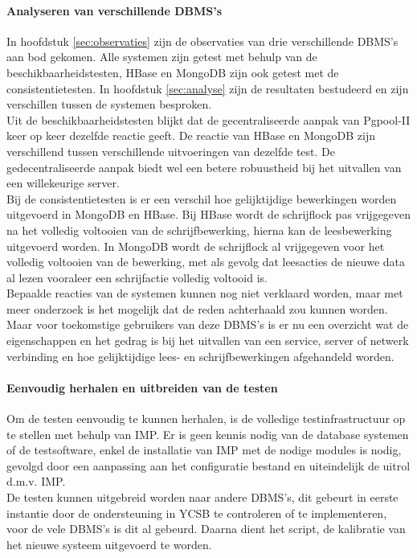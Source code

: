 \paragraph{Analyseren van verschillende DBMS's} In hoofdstuk \ref{sec:observaties} zijn de observaties van drie verschillende DBMS's aan bod gekomen. Alle systemen zijn getest met behulp van de beschikbaarheidstesten, HBase en MongoDB zijn ook getest met de consistentietesten. In hoofdstuk \ref{sec:analyse} zijn de resultaten bestudeerd en zijn verschillen tussen de systemen besproken. \\
Uit de beschikbaarheidstesten blijkt dat de gecentraliseerde aanpak van Pgpool-II keer op keer dezelfde reactie geeft. De reactie van HBase en MongoDB zijn verschillend tussen verschillende uitvoeringen van dezelfde test. De gedecentraliseerde aanpak biedt wel een betere robuustheid bij het uitvallen van een willekeurige server. \\
Bij de consistentietesten is er een verschil hoe gelijktijdige bewerkingen worden uitgevoerd in MongoDB en HBase. Bij HBase wordt de schrijflock pas vrijgegeven na het volledig voltooien van de schrijfbewerking, hierna kan de leesbewerking uitgevoerd worden. In MongoDB wordt de schrijflock al vrijgegeven voor het volledig voltooien van de bewerking, met als gevolg dat leesacties de nieuwe data al lezen vooraleer een schrijfactie volledig voltooid is. \\
Bepaalde reacties van de systemen kunnen nog niet verklaard worden, maar met meer onderzoek is het mogelijk dat de reden achterhaald zou kunnen worden. Maar voor toekomstige gebruikers van deze DBMS's is er nu een overzicht wat de eigenschappen en het gedrag is bij het uitvallen van een service, server of netwerk verbinding en hoe gelijktijdige lees- en schrijfbewerkingen afgehandeld worden. 

\paragraph{Eenvoudig herhalen en uitbreiden van de testen} Om de testen eenvoudig te kunnen herhalen, is de volledige testinfrastructuur op te stellen met behulp van IMP. Er is geen kennis nodig van de database systemen of de testsoftware, enkel de installatie van IMP met de nodige modules is nodig, gevolgd door een aanpassing aan het configuratie bestand en uiteindelijk de uitrol d.m.v. IMP. \\
De testen kunnen uitgebreid worden naar andere DBMS's, dit gebeurt in eerste instantie door de ondersteuning in YCSB te controleren of te implementeren, voor de vele DBMS's is dit al gebeurd. Daarna dient het script, de kalibratie van het nieuwe systeem uitgevoerd te worden. 